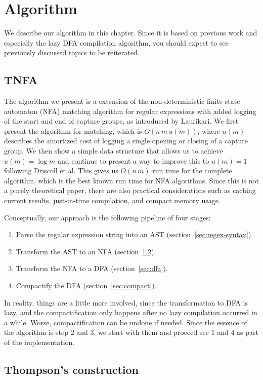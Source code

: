 \documentclass[11pt]{Thesis}
\theoremstyle{definition}
\newcommand{\Secref}[1]{section~\ref{sec:#1}}
\newcommand{\seclabel}[1]{\label{sec:#1}}
\begin{document}
\chapter{Algorithm} \seclabel{algo}
We describe our algorithm in this chapter. Since it is based on previous 
work and especially the lazy DFA compilation algorithm, you should expect to 
see previously discussed topics to be reiterated.

\section{TNFA}

The algorithm we present is a extension of the non-deterministic finite state
automaton (NFA) matching algorithm for regular expressions with added logging
of the start and end of capture groups, as introduced by
Laurikari\cite{Laur00a}. We first present the algorithm for matching,
which is $O(n\, m\, u(m))$, where $u(m)$ describes the amortized cost of
logging a single opening or closing of a capture group. We then show a
simple data structure that allows us to achieve $u(m) = \log m$ and
continue to present a way to improve this to $u(m) = 1$ following Driscoll et
al\cite{Dris89a}. This gives us $O(n\, m)$ run time for the
complete algorithm, which is the best known run time for NFA algorithms. Since
this is not a purely theoretical paper, there are also practical considerations
such as caching current results, just-in-time compilation, and compact memory
usage.

Conceptually, our approach is the following pipeline of four stages:
\begin{enumerate}
  \item Parse the regular expression string into an AST (\Secref{regex-syntax}).
  \item Transform the AST to an NFA (\Secref{thompson}).
  \item Transform the NFA to a DFA (\Secref{dfa}).
  \item Compactify the DFA (\Secref{compact}).
\end{enumerate}

In reality, things are a little more involved, since the transformation
to DFA is lazy, and the compactification only happens after no lazy
compilation occurred in a while. Worse, compactification can be
undone if needed. Since the essence of the algorithm is step 2 and 3, 
we start with them and proceed see 1 and 4 as part of the implementation.

\section{Thompson's construction} 	\seclabel{thompson}
\end{document}

